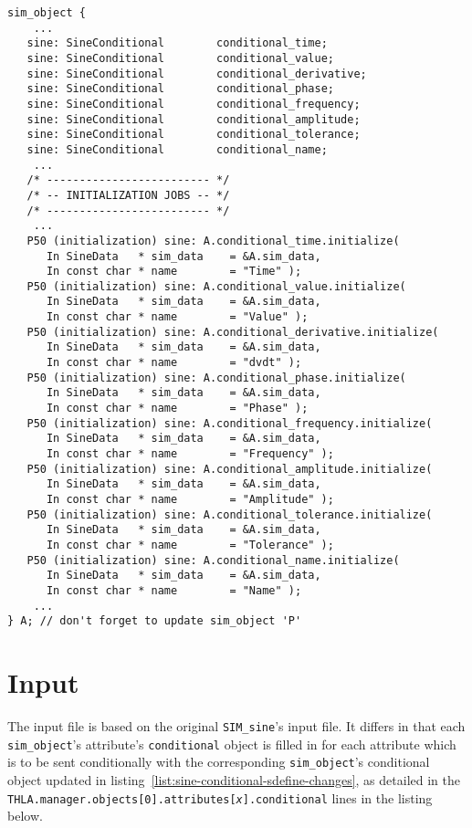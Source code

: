 \begin{lstlisting}[numbers=none,caption={Conditional \sdefine changes},label={list:sine-conditional-sdefine-changes}]
  sim_object {
    ...
   sine: SineConditional        conditional_time;
   sine: SineConditional        conditional_value;
   sine: SineConditional        conditional_derivative;
   sine: SineConditional        conditional_phase;
   sine: SineConditional        conditional_frequency;
   sine: SineConditional        conditional_amplitude;
   sine: SineConditional        conditional_tolerance;
   sine: SineConditional        conditional_name;
    ...
   /* ------------------------- */
   /* -- INITIALIZATION JOBS -- */
   /* ------------------------- */
    ...
   P50 (initialization) sine: A.conditional_time.initialize(
      In SineData   * sim_data    = &A.sim_data,
      In const char * name        = "Time" );
   P50 (initialization) sine: A.conditional_value.initialize(
      In SineData   * sim_data    = &A.sim_data,
      In const char * name        = "Value" );
   P50 (initialization) sine: A.conditional_derivative.initialize(
      In SineData   * sim_data    = &A.sim_data,
      In const char * name        = "dvdt" );
   P50 (initialization) sine: A.conditional_phase.initialize(
      In SineData   * sim_data    = &A.sim_data,
      In const char * name        = "Phase" );
   P50 (initialization) sine: A.conditional_frequency.initialize(
      In SineData   * sim_data    = &A.sim_data,
      In const char * name        = "Frequency" );
   P50 (initialization) sine: A.conditional_amplitude.initialize(
      In SineData   * sim_data    = &A.sim_data,
      In const char * name        = "Amplitude" );
   P50 (initialization) sine: A.conditional_tolerance.initialize(
      In SineData   * sim_data    = &A.sim_data,
      In const char * name        = "Tolerance" );
   P50 (initialization) sine: A.conditional_name.initialize(
      In SineData   * sim_data    = &A.sim_data,
      In const char * name        = "Name" );
    ...
} A; // don't forget to update sim_object 'P'
\end{lstlisting}

\section{Input}

The input file is based on the original {\tt SIM\_sine}'s input file. It differs in that
each {\tt sim\_object}'s attribute's {\tt conditional} object is filled in for each
attribute which is to be sent conditionally with the corresponding {\tt sim\_object}'s
conditional object updated in listing~\ref{list:sine-conditional-sdefine-changes},
as detailed in the {\tt THLA.manager.objects[0].attributes[{\em x}].conditional}
lines in the listing below.

